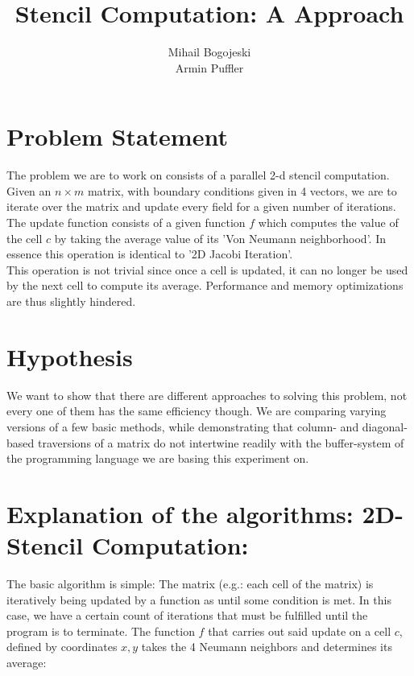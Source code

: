 \documentclass[11pt]{article}
\title{\textbf{Stencil Computation: A Approach}}
\author{Mihail Bogojeski\\
		Armin Puffler}
\date{}
\begin{document}
\maketitle

\section*{Problem Statement}

The problem we are to work on consists of a parallel 2-d stencil computation.\\
Given an $n \times m$ matrix, with boundary conditions given in 4 vectors, we are to iterate over the matrix and update every field for a given number of iterations.\\ 
The update function consists of a given function $f$ which computes the value of the cell $c$ by taking the average value of its 'Von Neumann neighborhood'. In essence this operation is identical to '2D Jacobi Iteration'.\\
This operation is not trivial since once a cell is updated, it can no longer be used by the next cell to compute its average. Performance and memory optimizations are thus slightly hindered.\\
 
\section*{Hypothesis}

We want to show that there are different approaches to solving this problem, not every one of them has the same efficiency though. We are comparing varying versions of a few basic methods, while demonstrating that column- and diagonal-based traversions of a matrix do not intertwine readily with the buffer-system of the programming language we are basing this experiment on.

\section*{Explanation of the algorithms: 2D-Stencil Computation: }

The basic algorithm is simple: The matrix (e.g.: each cell of the matrix) is iteratively being updated by a function as until some condition is met. In this case, we have a certain count of iterations that must be fulfilled until the program is to terminate.
The function $f$ that carries out said update on a cell $c$, defined by coordinates $x, y$ takes the 4 Neumann neighbors and determines its average:
\end{document}
